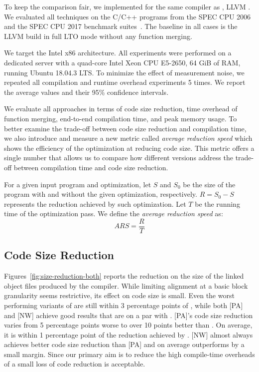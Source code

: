 To keep the comparison fair, we implemented {\ProjName} for the same compiler as \SOAName, LLVM . We evaluated all techniques on the C/C++ programs from the SPEC CPU 2006 and the SPEC CPU 2017 benchmark suites~\cite{spec}. The baseline in all cases is the LLVM build in full LTO mode without any function merging.

We target the Intel x86 architecture.
All experiments were performed on a dedicated server with a quad-core Intel Xeon CPU E5-2650, 64 GiB of RAM, running Ubuntu 18.04.3 LTS. To minimize the effect of measurement noise, we repeated all compilation and runtime overhead experiments 5 times. We report the average values and their 95\% confidence intervals.

We evaluate all approaches in terms of code size reduction, time overhead of function merging, end-to-end compilation time, and peak memory usage. To better examine the trade-off between code size reduction and compilation time, we also introduce and measure a new metric called \textit{average reduction speed} which shows the efficiency of the optimization at reducing code size. This metric offers a single number that allows us to compare how different versions address the trade-off between compilation time and code size reduction.

\begin{definition}
For a given input program and optimization, let $S$ and $S_0$ be the size of the program with and without the given optimization, respectively.
$R = S_0 - S$ represents the reduction achieved by such optimization.
Let $T$ be the running time of the optimization pass.
We define the \textit{average reduction speed} as:
\[
   ARS = \frac{R}{T}
\]  
\end{definition}

\subsection{Code Size Reduction} \label{sec:eval:size}

Figures~\ref{fig:size-reduction-both} reports the reduction on the size of the linked object files produced by the compiler.
While limiting alignment at a basic block granularity seems restrictive, its effect on code size is small. Even the worst performing variants of {\ProjName} are still within 3 percentage points of {\SOAName}, while both [PA] and [NW] achieve good results that are on a par with {\SOAName}. [PA]'s code size reduction varies from 5 percentage points worse to over 10 points better than {\SOAName}. On average, it is within 1 percentage point of the reduction achieved by {\SOAName}. [NW] almost always achieves better code size reduction than [PA] and on average outperforms {\SOAName} by a small margin. Since our primary aim is to reduce the high compile-time overheads of {\SOAName}
a small loss of code reduction is acceptable. 

